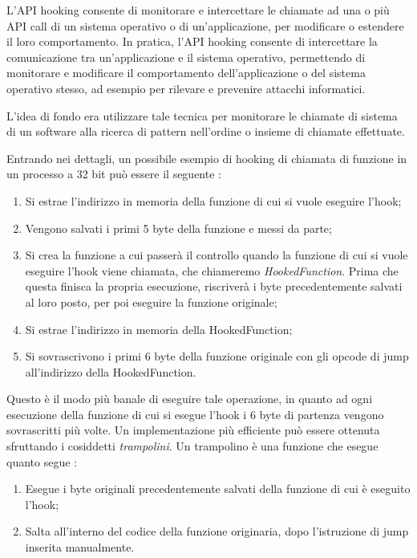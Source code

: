 L'API hooking  consente di monitorare e intercettare le chiamate ad una o più API call di un sistema operativo o di un'applicazione, per modificare o estendere il loro comportamento. In pratica, l'API hooking consente di intercettare la comunicazione tra un'applicazione e il sistema operativo, permettendo di monitorare e modificare il comportamento dell'applicazione o del sistema operativo stesso, ad esempio per rilevare e prevenire attacchi informatici.

L'idea di fondo era utilizzare tale tecnica per monitorare le chiamate di sistema di un software alla ricerca di pattern nell'ordine o insieme di chiamate effettuate. 


Entrando nei dettagli, un possibile  esempio di hooking di chiamata di  funzione in un processo a 32 bit può essere il seguente \cite{hooking1,hooking2}:
\begin{enumerate}
    \item Si estrae l'indirizzo in memoria della funzione di cui si vuole eseguire l'hook;
    \item Vengono salvati i primi 5 byte  della funzione e messi da parte;
    \item Si crea la funzione a cui passerà il controllo quando la funzione di cui si vuole eseguire l'hook viene chiamata, che chiameremo \textit{HookedFunction}. Prima che questa finisca la propria esecuzione, riscriverà i byte  precedentemente salvati al loro posto, per poi eseguire la funzione originale;
    \item Si estrae l'indirizzo in memoria della HookedFunction;
    \item Si sovrascrivono i primi 6 byte della funzione originale con gli opcode di  jump all'indirizzo della HookedFunction.
\end{enumerate}

Questo è il modo più banale di eseguire tale operazione, in quanto ad ogni esecuzione della funzione di cui si esegue l'hook i 6 byte di partenza vengono sovrascritti più volte. Un implementazione più efficiente può essere ottenuta sfruttando i cosiddetti \textit{trampolini}. Un trampolino è una funzione che esegue quanto segue \cite{hooking2}:
\begin{enumerate}
    \item Esegue i byte originali precedentemente salvati della funzione di cui è eseguito l'hook;
    \item Salta all'interno del codice della funzione originaria, dopo l'istruzione di jump inserita manualmente.
\end{enumerate}

